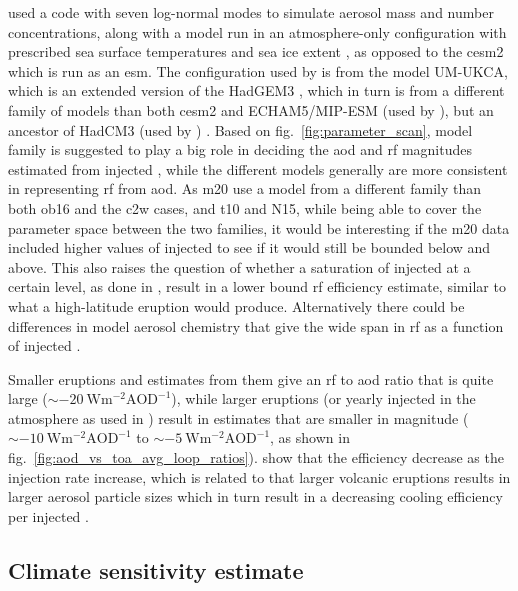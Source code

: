 \documentclass{ametsocV6.1}
\newcommand{\iso}[1][i]{{#1}njected \ce{SO2}}
\begin{document}
\citet{marshall2019, marshall2020, marshall2021} used a code with seven log-normal modes
to simulate aerosol mass and number concentrations, along with a model run in an
atmosphere-only configuration with prescribed sea surface temperatures and sea ice
extent \citep{marshall2019}, as opposed to the \gls{cesm2} which is run as an \gls{esm}.
The configuration used by \citet{marshall2019} is from the model UM-UKCA, which is an
extended version of the HadGEM3 \citep{dhomse2014}, which in turn is from a different
family of models than both \gls{cesm2} and ECHAM5/MIP-ESM (used by
\citet{timmreck2010,niemeier2015}), but an ancestor of HadCM3 (used by
\citet{gregory2016}) \citep{kuma2023}. Based on fig.~\ref{fig:parameter_scan}, model
family is suggested to play a big role in deciding the \gls{aod} and \gls{rf} magnitudes
estimated from \iso{}, while the different models generally are more consistent in
representing \gls{rf} from \gls{aod}. As \gls{m20} use a model from a different family
than both \gls{ob16} and the \gls{c2w} cases, and \gls{t10} and N15, while being able to
cover the parameter space between the two families, it would be interesting if the
\gls{m20} data included higher values of \iso{} to see if it would still be bounded
below and above. This also raises the question of whether a saturation of \iso{} at a
certain level, as done in \citet{niemeier2015}, result in a lower bound \gls{rf}
efficiency estimate, similar to what a high-latitude eruption would produce.
Alternatively there could be differences in model aerosol chemistry that give the wide
span in \gls{rf} as a function of \iso{}.

Smaller eruptions and estimates from them give an \gls{rf} to \gls{aod} ratio that is
quite large (\(\sim \SI{-20}{\watt\metre^{-2}\mathrm{AOD}^{-1}}\)), while larger
eruptions (or yearly \iso{} in the atmosphere as used in \citet{niemeier2015}) result in
estimates that are smaller in magnitude (\(\sim
\SI{-10}{\watt\metre^{-2}\mathrm{AOD}^{-1}}\) to \(\sim
\SI{-5}{\watt\metre^{-2}\mathrm{AOD}^{-1}}\), as shown in
fig.~\ref{fig:aod_vs_toa_avg_loop_ratios}). \citet{niemeier2017} show that the
efficiency decrease as the injection rate increase, which is related to that larger
volcanic eruptions results in larger aerosol particle sizes which in turn result in a
decreasing cooling efficiency per \iso{} \citep{english2013, timmreck2018}.

\subsection{Climate sensitivity estimate}
\end{document}
